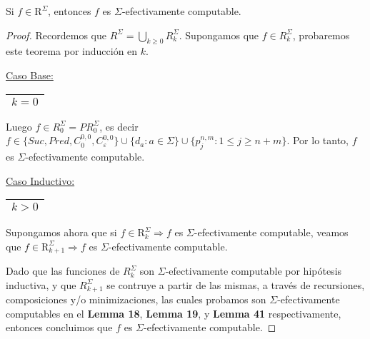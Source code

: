   \begin{theorem}
    \PN Si $f \in \mathrm{R}^{\Sigma}$, entonces $f$ es $\Sigma$-efectivamente computable.
  \end{theorem}
  \begin{proof}
    \PN Recordemos que $R^{\Sigma} = \bigcup\limits_{k \geq 0} R_{k}^{\Sigma}$. Supongamos que $f \in
    R_{k}^{\Sigma}$, probaremos este teorema por inducción en $k$.

    \vspace{3mm}
    \underline{Caso Base:} \begin{tabular}{|c|} \hline $k = 0$ \\\hline \end{tabular}

    \PN Luego $f \in R_{0}^{\Sigma} = PR_{0}^{\Sigma}$, es decir $f \in \{Suc, Pred, C_{0}^{0,0},
    C_{\varepsilon}^{0,0}\} \cup \{d_{a}: a \in \Sigma\} \cup \{p_{j}^{n,m} : 1 \leq j \geq n+m\}$. Por lo tanto, $f$ es
    $\Sigma$-efectivamente computable.

    \vspace{3mm}
		\underline{Caso Inductivo:} \begin{tabular}{|c|} \hline $k > 0$ \\\hline \end{tabular}

    \PN Supongamos ahora que si $f \in \mathrm{R}_{k}^{\Sigma} \Rightarrow f$ es $\Sigma$-efectivamente computable,
    veamos que $f \in \mathrm{R}_{k+1}^{\Sigma} \Rightarrow f$ es $\Sigma$-efectivamente computable.

    \PN Dado que las funciones de $R_{k}^{\Sigma}$ son $\Sigma$-efectivamente computable por hipótesis inductiva, y que
    $R_{k+1}^{\Sigma}$ se contruye a partir de las mismas, a través de recursiones, composiciones y/o minimizaciones,
    las cuales probamos son $\Sigma$-efectivamente computables en el \textbf{Lemma 18}, \textbf{Lemma 19}, y
    \textbf{Lemma 41} respectivamente, entonces concluimos que $f$ es $\Sigma$-efectivamente computable.
  \end{proof}

